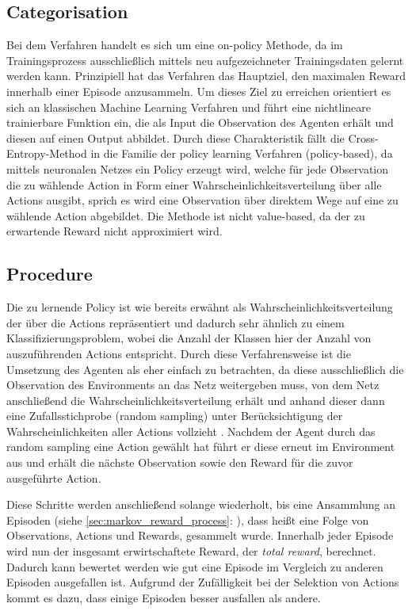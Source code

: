 \documentclass[11pt]{scrartcl}
\begin{document}
\subsection{Categorisation}
Bei dem Verfahren handelt es sich um eine on-policy Methode, da im Trainingsprozess ausschließlich
mittels neu aufgezeichneter Trainingsdaten gelernt werden kann. Prinzipiell hat das Verfahren das
Hauptziel, den maximalen Reward innerhalb einer Episode anzusammeln. Um dieses Ziel zu erreichen
orientiert es sich an klassischen Machine Learning Verfahren und führt eine nichtlineare trainierbare
Funktion ein, die als Input die Observation des Agenten erhält und diesen auf einen Output abbildet.
Durch diese Charakteristik fällt die Cross-Entropy-Method in die Familie der policy learning Verfahren
(policy-based), da mittels neuronalen Netzes ein Policy erzeugt wird, welche für jede Observation die
zu wählende Action in Form einer Wahrscheinlichkeitsverteilung über alle Actions ausgibt, sprich es
wird eine Observation über direktem Wege auf eine zu wählende Action abgebildet. Die
Methode ist nicht value-based, da der zu erwartende Reward nicht approximiert wird.

\subsection{Procedure} %
Die zu lernende Policy ist wie bereits erwähnt als Wahrscheinlichkeitsverteilung der
über die Actions repräsentiert und dadurch sehr ähnlich zu einem Klassifizierungsproblem,
wobei die Anzahl der Klassen hier der Anzahl von auszuführenden Actions entspricht. Durch
diese Verfahrensweise ist die Umsetzung des Agenten als eher einfach zu betrachten, da
diese ausschließlich die Observation des Environments an das Netz weitergeben muss, von
dem Netz anschließend die Wahrscheinlichkeitsverteilung erhält und anhand dieser dann eine
Zufallsstichprobe (random sampling) unter Berücksichtigung der Wahrscheinlichkeiten aller
Actions vollzieht \cite[~S.78]{L2018}. Nachdem der Agent durch das random sampling eine
Action gewählt hat führt er diese erneut im Environment aus und erhält die nächste
Observation sowie den Reward für die zuvor ausgeführte Action.

Diese Schritte werden anschließend solange wiederholt, bis eine Ansammlung an Episoden (siehe 
\autoref{sec:markov_reward_process}: ), dass heißt eine Folge
von Observations, Actions und Rewards, gesammelt wurde. Innerhalb jeder Episode wird nun der
insgesamt erwirtschaftete Reward, der \textit{total reward}, berechnet. Dadurch kann bewertet werden
wie gut eine Episode im Vergleich zu anderen Episoden ausgefallen ist. Aufgrund der Zufälligkeit
bei der Selektion von Actions kommt es dazu, dass einige Episoden besser ausfallen als andere.
\end{document}

